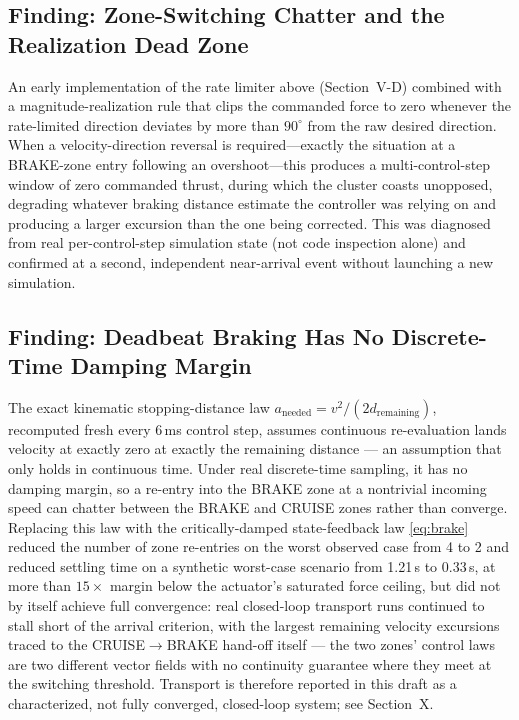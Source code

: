 \documentclass[journal]{IEEEtran}
\begin{document}
\subsection{Finding: Zone-Switching Chatter and the Realization Dead Zone}
An early implementation of the rate limiter above (Section~V-D) combined
with a magnitude-realization rule that clips the commanded force to zero
whenever the rate-limited direction deviates by more than $90^\circ$ from
the raw desired direction. When a velocity-direction reversal is
required---exactly the situation at a BRAKE-zone entry following an
overshoot---this produces a multi-control-step window of zero commanded
thrust, during which the cluster coasts unopposed, degrading whatever
braking distance estimate the controller was relying on and producing a
larger excursion than the one being corrected. This was diagnosed from
real per-control-step simulation state (not code inspection alone) and
confirmed at a second, independent near-arrival event without launching a
new simulation.

\subsection{Finding: Deadbeat Braking Has No Discrete-Time Damping Margin}
The exact kinematic stopping-distance law
$a_{\mathrm{needed}}=v^2/(2d_{\mathrm{remaining}})$, recomputed fresh every
6\,ms control step, assumes continuous re-evaluation lands velocity at
exactly zero at exactly the remaining distance --- an assumption that only
holds in continuous time. Under real discrete-time sampling, it has no
damping margin, so a re-entry into the BRAKE zone at a nontrivial incoming
speed can chatter between the BRAKE and CRUISE zones rather than converge.
Replacing this law with the critically-damped state-feedback law
\eqref{eq:brake} reduced the number of zone re-entries on the worst
observed case from 4 to 2 and reduced settling time on a synthetic
worst-case scenario from 1.21\,s to 0.33\,s, at more than $15\times$ margin
below the actuator's saturated force ceiling, but did not by itself achieve
full convergence: real closed-loop transport runs continued to stall short
of the arrival criterion, with the largest remaining velocity excursions
traced to the CRUISE$\rightarrow$BRAKE hand-off itself --- the two zones'
control laws are two different vector fields with no continuity guarantee
where they meet at the switching threshold. Transport is therefore reported
in this draft as a characterized, not fully converged, closed-loop system;
see Section~X.
\end{document}
